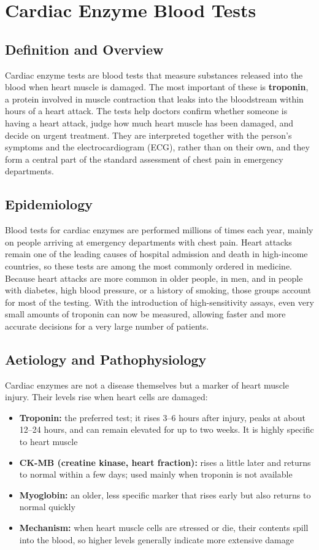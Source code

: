 \chapter{Cardiac Enzyme Blood Tests}

\section*{Definition and Overview}
Cardiac enzyme tests are blood tests that measure substances released into the blood when heart muscle is damaged. The most important of these is \textbf{troponin}, a protein involved in muscle contraction that leaks into the bloodstream within hours of a heart attack. The tests help doctors confirm whether someone is having a heart attack, judge how much heart muscle has been damaged, and decide on urgent treatment. They are interpreted together with the person's symptoms and the electrocardiogram (ECG), rather than on their own, and they form a central part of the standard assessment of chest pain in emergency departments.

\section*{Epidemiology}
Blood tests for cardiac enzymes are performed millions of times each year, mainly on people arriving at emergency departments with chest pain. Heart attacks remain one of the leading causes of hospital admission and death in high-income countries, so these tests are among the most commonly ordered in medicine. Because heart attacks are more common in older people, in men, and in people with diabetes, high blood pressure, or a history of smoking, those groups account for most of the testing. With the introduction of high-sensitivity assays, even very small amounts of troponin can now be measured, allowing faster and more accurate decisions for a very large number of patients.

\section*{Aetiology and Pathophysiology}
Cardiac enzymes are not a disease themselves but a marker of heart muscle injury. Their levels rise when heart cells are damaged:
\begin{itemize}
    \item \textbf{Troponin:} the preferred test; it rises 3--6 hours after injury, peaks at about 12--24 hours, and can remain elevated for up to two weeks. It is highly specific to heart muscle
    \item \textbf{CK-MB (creatine kinase, heart fraction):} rises a little later and returns to normal within a few days; used mainly when troponin is not available
    \item \textbf{Myoglobin:} an older, less specific marker that rises early but also returns to normal quickly
    \item \textbf{Mechanism:} when heart muscle cells are stressed or die, their contents spill into the blood, so higher levels generally indicate more extensive damage
\end{itemize}

